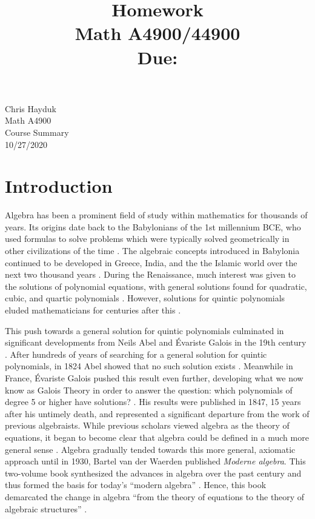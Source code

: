 \documentclass[11pt, reqno]{amsart}
\title[Homework \HW]{Homework \HW \\
Math A4900/44900\\
\small Due: \DUE}
\author{}
\theoremstyle{plain}
\theoremstyle{definition}
\theoremstyle{example}
\def\DUE{10/27/2020}
\begin{document}
\begin{flushright}
Chris Hayduk\\
Math A4900\\
Course Summary\\
\DUE
\end{flushright}

\section{Introduction}

Algebra has been a prominent field of study within mathematics for thousands of years. Its origins date back to the Babylonians of the 1st millennium BCE, who used formulas to solve problems which were typically solved geometrically in other civilizations of the time \cite{algebrawiki}. The algebraic concepts introduced in Babylonia continued to be developed in Greece, India, and the the Islamic world over the next two thousand years \cite{algebrawiki}. During the Renaissance, much interest was given to the solutions of polynomial equations, with general solutions found for quadratic, cubic, and quartic polynomials \cite{pinter, algebrawiki}. However, solutions for quintic polynomials eluded mathematicians for centuries after this \cite{pinter, algebrawiki}.

\par
This push towards a general solution for quintic polynomials culminated in significant developments from Neils Abel and Évariste Galois in the 19th century \cite{pinter, algebrawiki}. After hundreds of years of searching for a general solution for quintic polynomials, in 1824 Abel showed that no such solution exists \cite{pinter}. Meanwhile in France, Évariste Galois pushed this result even further, developing what we now know as Galois Theory in order to answer the question: which polynomials of degree 5 or higher have solutions? \cite{pinter}. His results were published in 1847, 15 years after his untimely death, and represented a significant departure from the work of previous algebraists. While previous scholars viewed algebra as the theory of equations, it began to become clear that algebra could be defined in a much more general sense \cite{pinter, algebrawiki, abstractwiki}. Algebra gradually tended towards this more general, axiomatic approach until in 1930, Bartel van der Waerden published \textit{Moderne algebra}. This two-volume book synthesized the advances in algebra over the past century and thus formed the basis for today's ``modern algebra'' \cite{abstractwiki}. Hence, this book demarcated the change in algebra ``from the theory of equations to the theory of algebraic structures'' \cite{abstractwiki}.
\end{document}
